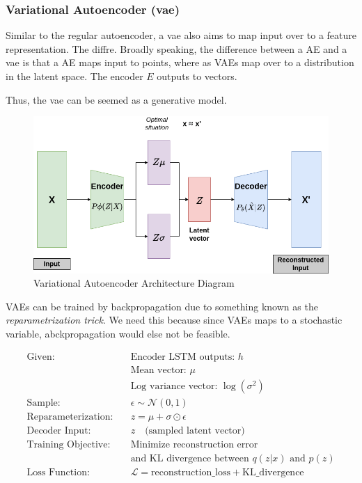\subsubsection{Variational Autoencoder (\acrshort{vae})}
\label{back:vae}

Similar to the regular autoencoder, a \acrfull{vae} also aims to map input over to a feature representation. The diffre. Broadly speaking, the difference between a AE and a \acrshort{vae} is that a AE maps input to points, where as VAEs map over to a distribution in the latent space. The encoder $E$ outputs to vectors. 

Thus, the \acrlong{vae} can be seemed as a generative model.


\begin{figure}[h]
    \centering
    \includegraphics[scale=0.5]{figures/vae.png}
    \caption{Variational Autoencoder Architecture Diagram}
    \label{fig:vaediagram}
\end{figure}


VAEs can be trained by backpropagation due to something known as the \textit{reparametrization trick}. We need this because since VAEs maps to a stochastic variable, abckpropagation would else not be feasible.

\begin{align*}
\text{Given:} & \quad \text{Encoder LSTM outputs: } h \\
& \quad \text{Mean vector: } \mu \\
& \quad \text{Log variance vector: } \log(\sigma^2) \\
\text{Sample:} & \quad \epsilon \sim \mathcal{N}(0, 1) \\
\text{Reparameterization:} & \quad z = \mu + \sigma \odot \epsilon \\
\text{Decoder Input:} & \quad z \quad \text{(sampled latent vector)} \\
\text{Training Objective:} & \quad \text{Minimize reconstruction error} \\
& \quad \text{and KL divergence between } q(z|x) \text{ and } p(z) \\
\text{Loss Function:} & \quad \mathcal{L} = \text{reconstruction\_loss} + \text{KL\_divergence}
\end{align*}



